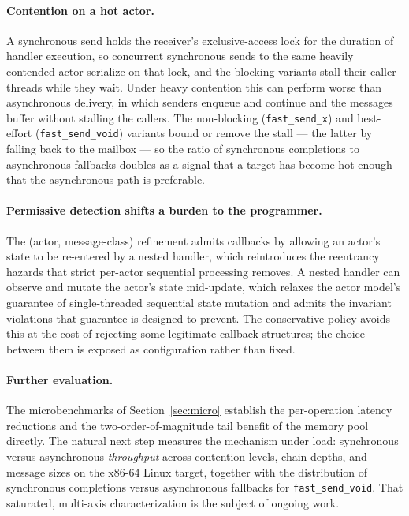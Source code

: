 \documentclass[11pt]{article}
\begin{document}
\paragraph{Contention on a hot actor.} A synchronous send holds the receiver's
exclusive-access lock for the duration of handler execution, so concurrent
synchronous sends to the same heavily contended actor serialize on that lock, and
the blocking variants stall their caller threads while they wait. Under heavy
contention this can perform worse than asynchronous delivery, in which senders
enqueue and continue and the messages buffer without stalling the callers. The
non-blocking (\texttt{fast\_send\_x}) and best-effort (\texttt{fast\_send\_void})
variants bound or remove the stall --- the latter by falling back to the mailbox
--- so the ratio of synchronous completions to asynchronous fallbacks doubles as
a signal that a target has become hot enough that the asynchronous path is
preferable.

\paragraph{Permissive detection shifts a burden to the programmer.} The
(actor, message-class) refinement admits callbacks by allowing an actor's state
to be re-entered by a nested handler, which reintroduces the reentrancy hazards
that strict per-actor sequential processing removes. A nested handler can
observe and mutate the actor's state mid-update, which relaxes the actor model's
guarantee of single-threaded sequential state mutation and admits the invariant
violations that guarantee is designed to prevent. The conservative policy avoids
this at the cost of rejecting some legitimate callback structures; the choice
between them is exposed as configuration rather than fixed.

\paragraph{Further evaluation.} The microbenchmarks of Section~\ref{sec:micro}
establish the per-operation latency reductions and the two-order-of-magnitude
tail benefit of the memory pool directly. The natural next step measures the
mechanism under load: synchronous versus asynchronous \emph{throughput} across
contention levels, chain depths, and message sizes on the x86-64 Linux target,
together with the distribution of synchronous completions versus asynchronous
fallbacks for \texttt{fast\_send\_void}. That saturated, multi-axis
characterization is the subject of ongoing work.
\end{document}
